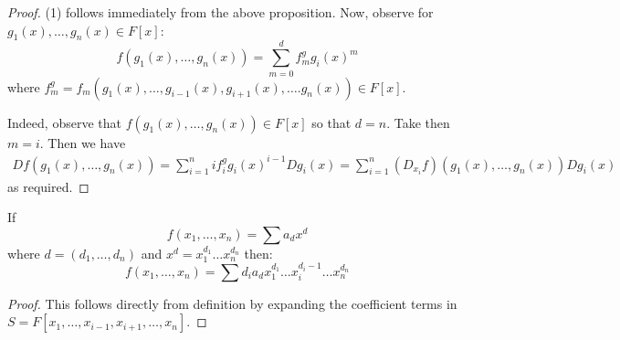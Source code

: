 \begin{proof}
  (1) follows immediately from the above proposition. Now, observe for
  $g_1(x), \dots, g_n(x) \in F[x]$:
  \begin{equation*}
    f(g_1(x), \dots, g_n(x))=
    \sum_{m=0}^d{f_m^gg_i(x)^m}
  \end{equation*}
  where $f_m^g=f_m(g_1(x), \dots, g_{i-1}(x),g_{i+1}(x), \dots.
  g_n(x)) \in F[x]$.

  Indeed, observe that $f(g_1(x), \dots, g_n(x)) \in F[x]$ so that $d=n$.
  Take then $m=i$. Then we have
  \begin{align*}
    D{f(g_1(x), \dots, g_n(x))}=
    \sum_{i=1}^n{if_i^gg_i(x)^{i-1}D{g_i(x)}}
    =\sum_{i=1}^n{(D_{x_i}{f})(g_1(x), \dots, g_n(x))D{g_i(x)}}
  \end{align*}
  as required.
\end{proof}
\begin{corollary}
  If
  \begin{equation*}
    f(x_1, \dots, x_n)=\sum{a_dx^d}
  \end{equation*}
  where $d=(d_1, \dots, d_n)$ and $x^d=x_1^{d_1} \dots x_n^{d_n}$
  then:
  \begin{equation*}
    f(x_1, \dots, x_n)=\sum{d_ia_dx_1^{d_1} \dots x_i^{d_i-1} \dots x_n^{d_n}}
  \end{equation*}
\end{corollary}
\begin{proof}
  This follows directly from definition by expanding the coefficient
  terms in $S=F[x_1, \dots, x_{i-1},x_{i+1}, \dots, x_n]$.
\end{proof}

